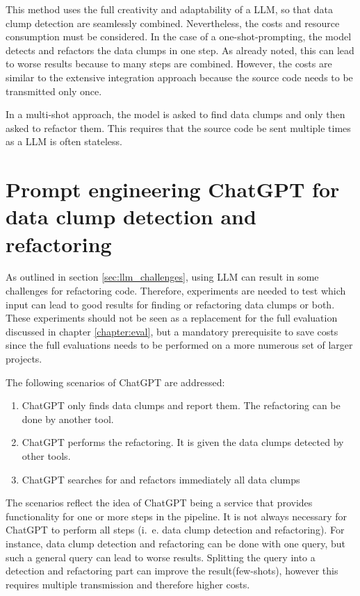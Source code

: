 This method uses the full creativity and adaptability of a \ac{LLM}, so that data clump detection are seamlessly combined. Nevertheless, the costs and resource consumption must be considered. In the case of a one-shot-prompting, the model detects and refactors the data clumps in one step. As already noted, this can lead to worse results because to many steps are combined. However, the costs are similar to the  extensive integration approach because the source code needs to be transmitted only once. 

In a multi-shot approach, the model is asked to find data clumps and only then asked to refactor them. This requires that the source code be sent multiple times as a \ac{LLM} is often stateless. 

\section{Prompt engineering ChatGPT for data clump detection and refactoring}\label{sec:prompt_engineering_impl}

As outlined in  section \ref{sec:llm_challenges}, using \ac{LLM} can result in some challenges for refactoring code. Therefore, experiments are needed to test which input can lead to good results for finding or refactoring data clumps or both. These experiments should not be seen as a replacement for the full evaluation discussed in chapter \ref{chapter:eval}, but a mandatory prerequisite to save costs since the full evaluations needs to be performed on a more numerous set of larger projects.

The following scenarios of ChatGPT are addressed:
\begin{enumerate}
    \item ChatGPT only finds data clumps and report them. The refactoring can be done by another tool.
    \item ChatGPT performs the refactoring. It is given the data clumps detected by other tools. 
    \item ChatGPT searches for and refactors immediately all data clumps
\end{enumerate}

The scenarios reflect the idea of ChatGPT being a service that provides functionality for one or more steps in the pipeline. It is not always necessary for ChatGPT to perform all steps (i.~e.  data clump detection and refactoring). For instance, data clump detection and refactoring can be done with one query, but such a general query can lead to worse  results. Splitting the query into a detection and refactoring part can improve the result(few-shots), however this requires multiple transmission and therefore higher costs. 

